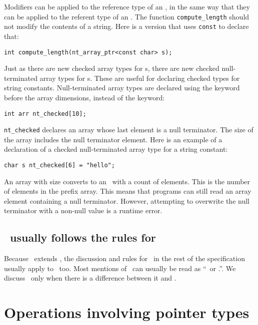 Modifiers can be applied to the reference type of
an \ntarrayptr, in the same way that they can be applied to the
referent type of an \arrayptr.
The function \lstinline+compute_length+
should not modify the contents of a string. Here
is a version that uses \lstinline+const+ to declare that:
\begin{lstlisting}
int compute_length(nt_array_ptr<const char> s);
\end{lstlisting}

Just as there are new checked array types for \arrayptr s,
there are new checked null-terminated array types for \ntarrayptr s.
These are useful for declaring  checked types for string constants.
Null-terminated array types are declared using the
 keyword before the array dimensions,
instead of the  keyword:
\begin{lstlisting}
int arr nt_checked[10];
\end{lstlisting}
\lstinline+nt_checked+ declares an array whose
last element is a null terminator.  The size of the
array includes the null terminator element.
Here is an example of a declaration of a checked null-terminated
array type for a string constant:
\begin{lstlisting}
char s nt_checked[6] = "hello";
\end{lstlisting}

An  array with size  converts
to an \ntarrayptr\ with a count of  elements.
This is the number of elements in the prefix array.   This means that
programs can still read an array element containing a null terminator.
However, attempting to overwrite the null terminator with a non-null
value is a runtime error.

\subsection{\ntarrayptr\ usually follows the rules for \arrayptr}
Because \ntarrayptr\ extends \arrayptr, the discussion and rules for
\arrayptr\ in the rest of the specification usually apply to \ntarrayptr\
too.  Most mentions of \arrayptr\ can usually be read as
``\arrayptr\ or \ntarrayptr.''.  We discuss \ntarrayptr\ only when
there is a difference between it and \arrayptr.

\section{Operations involving pointer types}

